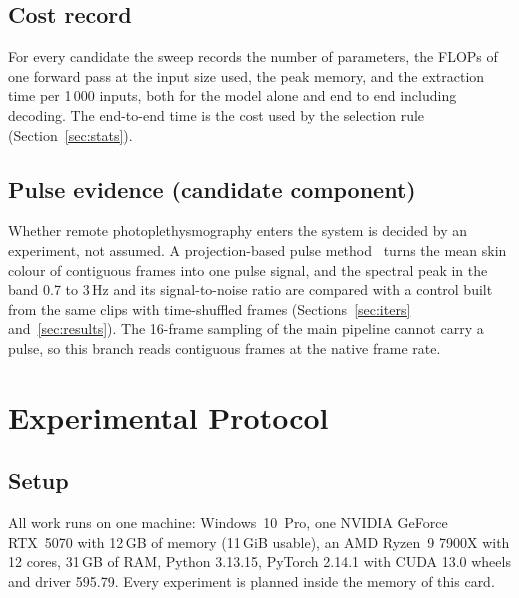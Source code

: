 \documentclass[conference,a4paper]{IEEEtran_nodash}
\begin{document}
\subsection{Cost record}
For every candidate the sweep records the number of parameters, the FLOPs of
one forward pass at the input size used, the peak memory, and the extraction
time per 1\,000 inputs, both for the model alone and end to end including
decoding. The end-to-end time is the cost used by the selection rule
(Section~\ref{sec:stats}).

\subsection{Pulse evidence (candidate component)}
Whether remote photoplethysmography enters the system is decided by an
experiment, not assumed. A projection-based pulse method~\cite{wang2017pos}
turns the mean skin colour of contiguous frames into one pulse signal, and
the spectral peak in the band 0.7 to 3\,Hz and its signal-to-noise ratio are
compared with a control built from the same clips with time-shuffled frames
(Sections~\ref{sec:iters} and~\ref{sec:results}). The 16-frame sampling of the main pipeline cannot
carry a pulse, so this branch reads contiguous frames at the native frame
rate.

\section{Experimental Protocol}\label{sec:protocol}

\subsection{Setup}
All work runs on one machine: Windows~10~Pro, one NVIDIA GeForce RTX~5070
with 12\,GB of memory (11\,GiB usable), an AMD Ryzen~9 7900X with 12 cores,
31\,GB of RAM, Python 3.13.15, PyTorch 2.14.1 with CUDA 13.0 wheels and driver
595.79. Every experiment is planned inside the memory of this card.
\end{document}
